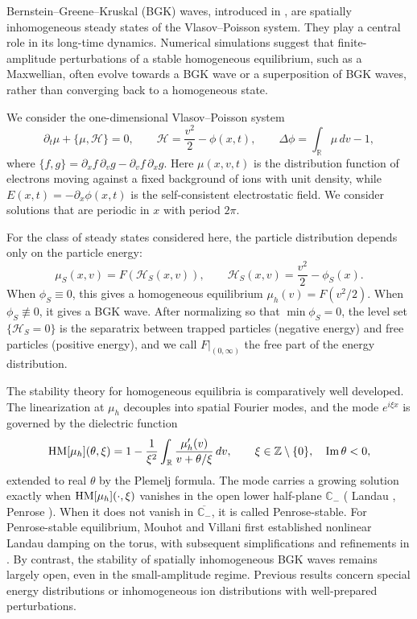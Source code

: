 \documentclass[10pt,reqno]{amsart}
\theoremstyle{definition}
\begin{document}
Bernstein--Greene--Kruskal (BGK) waves, introduced in \cite{BGK57}, are spatially inhomogeneous steady states of the Vlasov--Poisson system. They play a central role in its long-time dynamics. Numerical simulations suggest that finite-amplitude perturbations of a stable homogeneous equilibrium, such as a Maxwellian, often evolve towards a BGK wave or a superposition of BGK waves, rather than converging back to a homogeneous state.

We consider the one-dimensional Vlasov--Poisson system
\begin{equation}\label{VP}
\partial_t\mu+\{\mu,\mathcal H\}=0,
\qquad
\mathcal H=\frac{v^2}{2}-\phi(x,t),
\qquad
\Delta\phi=\int_{\mathbb R}\mu\,dv-1,
\end{equation}
where $\{f,g\}=\partial_xf\,\partial_vg-\partial_vf\,\partial_xg$. Here $\mu(x,v,t)$ is the distribution function of electrons moving against a fixed background of ions with unit density, while $E(x,t)=-\partial_x\phi(x,t)$ is the self-consistent electrostatic field. We consider solutions that are periodic in $x$ with period $2\pi$.

For the class of steady states considered here, the particle distribution depends only on the particle energy:
\[
\mu_S(x,v)=F(\mathcal H_S(x,v)),
\qquad
\mathcal H_S(x,v)=\frac{v^2}{2}-\phi_S(x).
\]
When $\phi_S\equiv0$, this gives a homogeneous equilibrium $\mu_h(v)=F(v^2/2)$. When $\phi_S\not\equiv0$, it gives a BGK wave. After normalizing so that $\min\phi_S=0$, the level set $\{\mathcal H_S=0\}$ is the separatrix between trapped particles (negative energy) and free particles (positive energy), and we call $F|_{(0,\infty)}$ the free part of the energy distribution.

The stability theory for homogeneous equilibria is comparatively well developed. The linearization at $\mu_h$ decouples into spatial Fourier modes, and the mode $e^{i\xi x}$ is governed by the dielectric function
\begin{equation}\label{HM}
\mathrm{HM}[\mu_h](\theta,\xi)=1-\frac1{\xi^2}\int_{\mathbb R}\frac{\mu_h'(v)}{v+\theta/\xi}\,dv,
\qquad \xi\in\mathbb Z\setminus\{0\},\quad \operatorname{Im}\theta<0,
\end{equation}
extended to real $\theta$ by the Plemelj formula. The mode carries a growing solution exactly when $\mathrm{HM}[\mu_h](\cdot,\xi)$ vanishes in the open lower half-plane $\mathbb C_-$ ( Landau \cite{L46}, Penrose \cite{P60}). When it does not vanish in $\overline{{\mathbb{C}_-}}$, it is called Penrose-stable. For Penrose-stable equilibrium, Mouhot and Villani \cite{MV11} first established nonlinear Landau damping on the torus, with subsequent simplifications and refinements in \cite{BMM16,GNR21,IPWW24b}. By contrast, the stability of spatially inhomogeneous BGK waves remains largely open, even in the small-amplitude regime. Previous results \cite{D19,GL17,HM24,W26} concern special energy distributions or inhomogeneous ion distributions with well-prepared perturbations.
\end{document}
